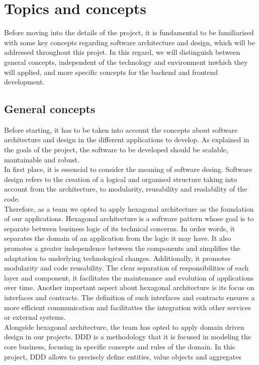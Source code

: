 \documentclass[../memory.tex]{subfiles}
\begin{document}
\section{Topics and concepts}
Before moving into the details of the project, it is fundamental to be
familiarised with some key concepts regarding software architecture and design,
which will be addressed throughout this projet. In this regard, we will
distinguish between general concepts, independent of the technology and
environment inwhich they will applied, and more specific concepts for the
backend and frontend development.
\subsection{General concepts}
Before starting, it has to be taken into account the concepts about software
architecture and design in the different applications to develop. As explained
in the goals of the project, the software to be developed should be scalable,
mantainable and robust.
\\[8pt]
In first place, it is essencial to consider the meaning of software desing.
Software design refers to the creation of a logical and organised structure
taking into account from the architecture, to modularity, reusability and
readability of the code.
\\[8pt]
Therefore, as a team we opted to apply hexagonal architecture as the foundation
of our applications. Hexagonal architecture is a software pattern whose goal is
to separate between business logic of its technical concerns. In order words, it
separates the domain of an application from the logic it may have. It also
promotes a greater independence between the components and simplifies the
adaptation to underlying technological changes. Additionally, it promotes
modularity and code reusability. The clear separation of responsibilities of
each layer and component, it facilitates the maintenance and evolution of
applications over time. Another important aspect about hexagonal architecture is
its focus on interfaces and contracts. The definition of such interfaces and
contracts ensures a more efficient communication and facilitattes the
integration with other services or external systems.
\\
Alongside hexagonal architecture, the team has opted to apply domain driven
design in our projects. DDD is a methodology that it is focused in modeling the
core business, focusing in specific concepts and rules of the domain. In this
project, DDD allows to precisely define entities, value objects and aggregates
\end{document}
